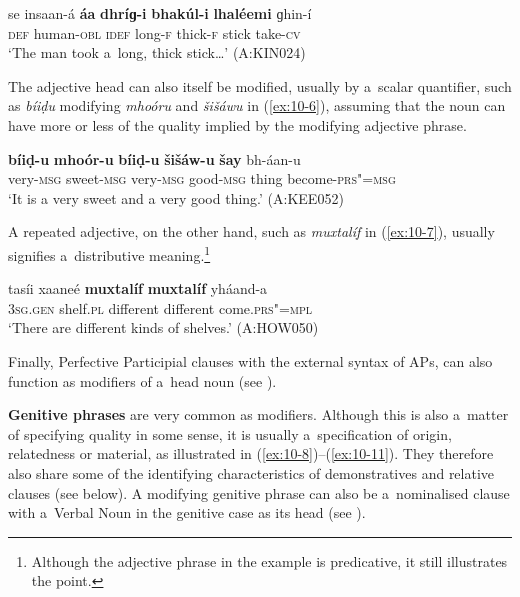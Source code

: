 \begin{exe}
\ex
\label{ex:10-5}
\gll se insaan-á \textbf{áa} \textbf{dhríɡ-i} \textbf{bhakúl-i} \textbf{lhaléemi} ɡhin-í \\
\textsc{def} human-\textsc{obl} \textsc{idef} long-\textsc{f} thick-\textsc{f} stick  take-\textsc{cv} \\
\glt `The man took a~long, thick stick{\ldots}' (A:KIN024)
\end{exe}

The adjective head can also itself be modified, usually by a~scalar quantifier, such as \textit{bíiḍu} modifying \textit{mhoóru} and \textit{šišáwu} in (\ref{ex:10-6}), assuming that the noun can have more or less of the quality implied by the modifying adjective phrase. 

\begin{exe}
\ex
\label{ex:10-6}
\gll \textbf{bíiḍ-u} \textbf{mhoór-u} \textbf{bíiḍ-u} \textbf{šišáw-u} \textbf{šay} bh-áan-u\\
very-\textsc{msg} sweet-\textsc{msg} very-\textsc{msg} good-\textsc{msg} thing become-\textsc{prs"=msg} \\
\glt `It is a very sweet and a very good thing.' (A:KEE052)
\end{exe}

A repeated adjective, on the other hand, such as \textit{muxtalíf} in (\ref{ex:10-7}), usually signifies a~distributive meaning.\footnote{Although the adjective phrase in the example is predicative, it still illustrates the point.}

\begin{exe}
\ex
\label{ex:10-7}
\gll tasíi xaaneé \textbf{muxtalíf} \textbf{muxtalíf} yháand-a \\
\textsc{3sg.gen} shelf.\textsc{pl} different different come.\textsc{prs"=mpl} \\
\glt `There are different kinds of shelves.' (A:HOW050)
\end{exe}

Finally, Perfective Participial clauses with the external syntax of APs, can also function as modifiers of a~head noun (see ). 


\textbf{Genitive phrases} are very common as modifiers. Although this is also a~matter of specifying quality in some
sense, it is usually a~specification of origin, relatedness or material, as illustrated in
(\ref{ex:10-8})--(\ref{ex:10-11}). They therefore
also share some of the identifying characteristics of demonstratives and relative clauses (see
below). A modifying genitive phrase can also be a~nominalised clause with a~Verbal Noun in the genitive case as its head (see ).

